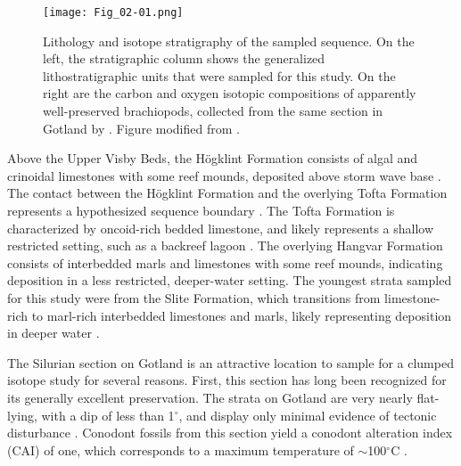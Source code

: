 \documentclass[5p, authoryear]{elsarticle}
\begin{document}
\begin{figure*}[t]
\centering
\texttt{[image: Fig\_02-01.png]}
\caption{Lithology and isotope stratigraphy of the sampled sequence. On the left, the stratigraphic column shows the generalized lithostratigraphic units that were sampled for this study. On the right are the carbon and oxygen isotopic compositions of apparently well-preserved brachiopods, collected from the same section in Gotland by \cite{Bickert1997}. Figure modified from \cite{Bickert1997}.}
\label{column}
\end{figure*}

Above the Upper Visby Beds, the H\"{o}gklint Formation consists of algal and crinoidal limestones with some reef mounds, deposited above storm wave base \citep{Riding1991, Samtleben1996, Watts2000}. The contact between the H\"{o}gklint Formation and the overlying Tofta Formation represents a hypothesized sequence boundary \citep{Calner2004b}. The Tofta Formation is characterized by oncoid-rich bedded limestone, and likely represents a shallow restricted setting, such as a backreef lagoon \citep{Riding1991, Samtleben1996}. The overlying Hangvar Formation consists of interbedded marls and limestones with some reef mounds, indicating deposition in a less restricted, deeper-water setting. The youngest strata sampled for this study were from the Slite Formation, which transitions from limestone-rich to marl-rich interbedded limestones and marls, likely representing deposition in deeper water \citep{Calner2004a}. 

The Silurian section on Gotland is an attractive location to sample for a clumped isotope study for several reasons. First, this section has long been recognized for its generally excellent preservation. The strata on Gotland are very nearly flat-lying, with a dip of less than 1$^{\circ}$, and display only minimal evidence of tectonic disturbance \citep{Calner2004a, Jeppsson1983}. Conodont fossils from this section yield a conodont alteration index (CAI) of one, which corresponds to a maximum temperature of $\sim$100$^{\circ}$C \citep{Epstein1976, Jeppsson1983, Wenzel2000}. 
\end{document}
